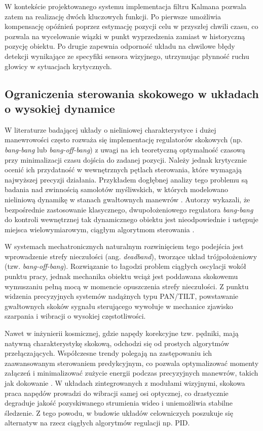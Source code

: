 \documentclass[a4paper,twoside,12pt]{book}
\begin{document}
W kontekście projektowanego systemu implementacja filtru Kalmana pozwala zatem na realizację dwóch kluczowych funkcji. Po pierwsze umożliwia kompensację opóźnień poprzez estymację pozycji celu w przyszłej chwili czasu, co pozwala na wycelowanie wiązki w punkt wyprzedzenia zamiast w historyczną pozycję obiektu. Po drugie zapewnia odporność układu na chwilowe błędy detekcji wynikające ze specyfiki sensora wizyjnego, utrzymując płynność ruchu głowicy w sytuacjach krytycznych.

\subsection{Ograniczenia sterowania skokowego w układach o wysokiej dynamice}

W literaturze badającej układy o nieliniowej charakterystyce i dużej manewrowości często rozważa się implementację regulatorów skokowych (np. \textit{bang-bang} lub \textit{bang-off-bang}) z uwagi na ich teoretyczną optymalność czasową przy minimalizacji czasu dojścia do zadanej pozycji. Należy jednak krytycznie ocenić ich przydatność w wewnętrznych pętlach sterowania, które wymagają najwyższej precyzji działania. Przykładem dogłębnej analizy tego problemu są badania nad zwinnością samolotów myśliwskich, w których modelowano nieliniową dynamikę w stanach gwałtownych manewrów \cite{bib:caferov2019building}. Autorzy wykazali, że bezpośrednie zastosowanie klasycznego, dwupołożeniowego regulatora \textit{bang-bang} do kontroli wewnętrznej tak dynamicznego obiektu jest nieodpowiednie i ustępuje miejsca wielowymiarowym, ciągłym algorytmom sterowania \cite{bib:caferov2019building}.

W systemach mechatronicznych naturalnym rozwinięciem tego podejścia jest wprowadzenie strefy nieczułości (ang. \textit{deadband}), tworzące układ trójpołożeniowy (tzw. \textit{bang-off-bang}). Rozwiązanie to łagodzi problem ciągłych oscylacji wokół punktu pracy, jednak mechanika obiektu wciąż jest poddawana skokowemu wymuszaniu pełną mocą w momencie opuszczenia strefy nieczułości. Z punktu widzenia precyzyjnych systemów nadążnych typu PAN/TILT, powstawanie gwałtownych skoków sygnału sterującego wywołuje w mechanice zjawisko szarpania i wibracji o wysokiej częstotliwości. 

Nawet w inżynierii kosmicznej, gdzie napędy korekcyjne tzw. pędniki, mają natywną charakterystykę skokową, odchodzi się od prostych algorytmów przełączających. Współczesne trendy polegają na zastępowaniu ich zaawansowanym sterowaniem predykcyjnym, co pozwala optymalizować momenty załączeń i minimalizować zużycie energii podczas precyzyjnych manewrów, takich jak dokowanie \cite{bib:VirgiliLlop2017}. W układach zintegrowanych z modułami wizyjnymi, skokowa praca napędów prowadzi do wibracji samej osi optycznej, co drastycznie degraduje jakość pozyskiwanego strumienia wideo i uniemożliwia stabilne śledzenie. Z tego powodu, w budowie układów celowniczych poszukuje się alternatyw na rzecz ciągłych algorytmów regulacji np. PID.
\end{document}
